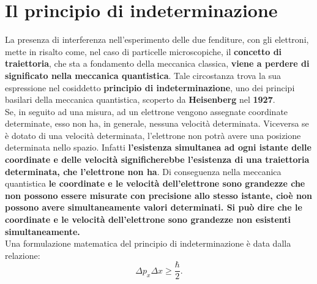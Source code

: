 \section{Il principio di indeterminazione}
La presenza di interferenza nell'esperimento delle due fenditure, con gli elettroni, mette in risalto come, nel caso di particelle microscopiche, il \textbf{concetto di traiettoria}, che sta a fondamento della meccanica classica, \textbf{viene a perdere di significato nella meccanica quantistica}. Tale circostanza trova la sua espressione nel cosiddetto \textbf{principio di indeterminazione}, uno dei principi basilari della meccanica quantistica, scoperto da \textbf{Heisenberg} nel \textbf{1927}.\\
Se, in seguito ad una misura, ad un elettrone vengono assegnate coordinate determinate, esso non ha, in generale, nessuna velocità determinata. Viceversa se è dotato di una velocità determinata, l'elettrone non potrà avere una posizione determinata nello spazio. Infatti \textbf{l'esistenza simultanea ad ogni istante delle coordinate e delle velocità significherebbe l'esistenza di una traiettoria determinata, che l'elettrone non ha}. Di conseguenza nella meccanica quantistica \textbf{le coordinate e le velocità dell'elettrone sono grandezze che non possono essere misurate con precisione allo stesso istante, cioè non possono avere simultaneamente valori determinati. Si può dire che le coordinate e le velocità dell'elettrone sono grandezze non esistenti simultaneamente.}\\
Una formulazione matematica del principio di indeterminazione è data dalla relazione:
	\begin{equation}
		\boxed{\boxed{
			\Delta p_x \Delta x \geq \frac{\hbar}{2}.
			}}
	\end{equation}
